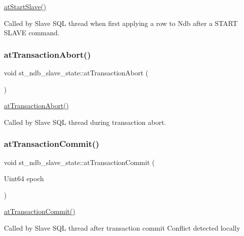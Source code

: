 \mbox{\hyperlink{structst__ndb__slave__state_a48c3936791f966c865d2c28a0b305012}{at\+Start\+Slave()}}

Called by Slave S\+QL thread when first applying a row to Ndb after a S\+T\+A\+RT S\+L\+A\+VE command. \mbox{\label{structst__ndb__slave__state_a919ec93137f0ebaae6e29118882dd141}} 
\subsubsection{\texorpdfstring{at\+Transaction\+Abort()}{atTransactionAbort()}}
{\footnotesize\ttfamily void st\+\_\+ndb\+\_\+slave\+\_\+state\+::at\+Transaction\+Abort (\begin{DoxyParamCaption}{ }\end{DoxyParamCaption})}

\mbox{\hyperlink{structst__ndb__slave__state_a919ec93137f0ebaae6e29118882dd141}{at\+Transaction\+Abort()}}

Called by Slave S\+QL thread during transaction abort. \mbox{\label{structst__ndb__slave__state_a3d731f8bfdce1ea3802fcb0cb3a27d73}} 
\subsubsection{\texorpdfstring{at\+Transaction\+Commit()}{atTransactionCommit()}}
{\footnotesize\ttfamily void st\+\_\+ndb\+\_\+slave\+\_\+state\+::at\+Transaction\+Commit (\begin{DoxyParamCaption}\item[{Uint64}]{epoch }\end{DoxyParamCaption})}

\mbox{\hyperlink{structst__ndb__slave__state_a3d731f8bfdce1ea3802fcb0cb3a27d73}{at\+Transaction\+Commit()}}

Called by Slave S\+QL thread after transaction commit Conflict detected locally

